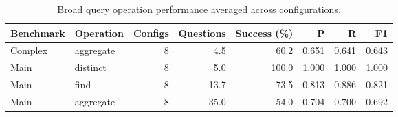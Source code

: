﻿\begin{table}[htbp]
\centering
\small
\caption{Broad query operation performance averaged across configurations.}
\label{tab:operation-performance}
\begin{tabular}{llrrrrrr}
\toprule
Benchmark & Operation & Configs & Questions & Success (\%) & P & R & F1 \\
\midrule
Complex & aggregate & 8 & 4.5 & 60.2 & 0.651 & 0.641 & 0.643 \\
Main & distinct & 8 & 5.0 & 100.0 & 1.000 & 1.000 & 1.000 \\
Main & find & 8 & 13.7 & 73.5 & 0.813 & 0.886 & 0.821 \\
Main & aggregate & 8 & 35.0 & 54.0 & 0.704 & 0.700 & 0.692 \\
\bottomrule
\end{tabular}
\end{table}


